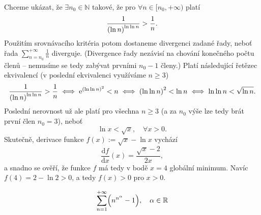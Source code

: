 \documentclass[answers]{exam}
\let\originalleft\left
\let\originalright\right
\renewcommand{\left}{\mathopen{}\mathclose\bgroup\originalleft}
\renewcommand{\right}{\aftergroup\egroup\originalright}
\begin{document}
\begin{questions}
  \begin{solution}
  	Chceme ukázat, že $\exists n_0 \in \mathbb{N}$ takové, že pro $\forall n \in [n_0, +\infty)$ platí
  	\begin{equation*}
  		\frac{1}{\left( \ln n \right)^{\ln \ln n}}
  		>
  		\frac{1}{n}.	
  	\end{equation*}
		Použitím srovnávacího kritéria potom dostaneme divergenci zadané řady, neboť řada $\sum_{n = n_0}^{+\infty} \frac{1}{n}$ diverguje. (Divergence řady nezávisí na chování konečného počtu členů -- nemusíme se tedy zabývat prvními $n_0 -1$ členy.)
		Platí následující řetězec ekvivalencí (v poslední ekvivalenci využíváme $n \ge 3$)
  	\begin{equation*}
  		\frac{1}{\left( \ln n \right)^{\ln \ln n}}
  		>
  		\frac{1}{n}
  		\iff
  		\mathrm{e}^{\left( \ln \ln n \right)^2}
  		<
  		n
  		\iff
  		\left( \ln \ln n \right)^2
  		<
  		\ln n
  		\iff  
  		\ln \ln n 
  		<
  		\sqrt{\ln n}.			
  	\end{equation*}
  	Poslední nerovnost už ale platí pro všechna $n \ge 3$ (a za $n_0$ výše lze tedy brát první člen $n_0 = 3$), neboť
  	\begin{equation*}
  		\ln x < \sqrt{x}, \quad \forall x > 0.
  	\end{equation*}
  	Skutečně, derivace funkce $f(x) := \sqrt{x} - \ln x$ vychází
  	\begin{equation*}
  		\frac{\mathrm{d}f}{\mathrm{d}x}(x)
  		=
  		\frac{\sqrt{x} - 2}{2x},
  	\end{equation*}
  	a snadno se ověří, že funkce $f$ má tedy v bodě $x = 4$ globální minimum. Navíc $f(4) = 2 - \ln 2 > 0$, a tedy $f(x) > 0$ pro $x > 0$.
  \end{solution}

  \question
  \begin{equation*}
    \sum_{n = 1}^{+\infty}
    \left( n^{n^{\alpha}} - 1 \right),
    \quad
    \alpha \in \mathbb{R}
  \end{equation*}
  

\end{questions}
\end{document}
